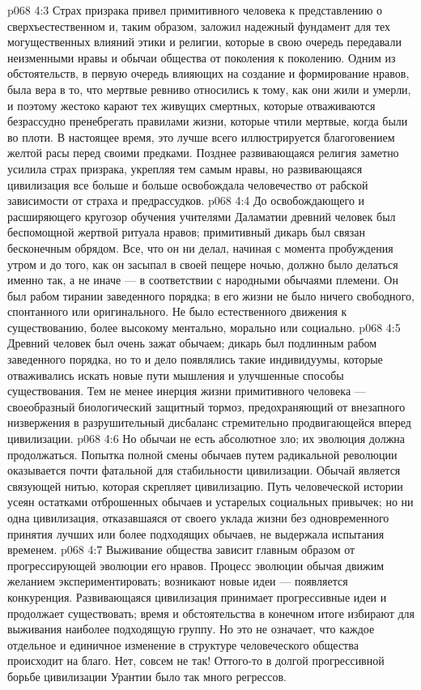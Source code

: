 \vs p068 4:3 \pc Страх призрака привел примитивного человека к представлению о сверхъестественном и, таким образом, заложил надежный фундамент для тех могущественных влияний этики и религии, которые в свою очередь передавали неизменными нравы и обычаи общества от поколения к поколению. Одним из обстоятельств, в первую очередь влияющих на создание и формирование нравов, была вера в то, что мертвые ревниво относились к тому, как они жили и умерли, и поэтому жестоко карают тех живущих смертных, которые отваживаются безрассудно пренебрегать правилами жизни, которые чтили мертвые, когда были во плоти. В настоящее время, это лучше всего иллюстрируется благоговением желтой расы перед своими предками. Позднее развивающаяся религия заметно усилила страх призрака, укрепляя тем самым нравы, но развивающаяся цивилизация все больше и больше освобождала человечество от рабской зависимости от страха и предрассудков.
\vs p068 4:4 До освобождающего и расширяющего кругозор обучения учителями Даламатии древний человек был беспомощной жертвой ритуала нравов; примитивный дикарь был связан бесконечным обрядом. Все, что он ни делал, начиная с момента пробуждения утром и до того, как он засыпал в своей пещере ночью, должно было делаться именно так, а не иначе --- в соответствии с народными обычаями племени. Он был рабом тирании заведенного порядка; в его жизни не было ничего свободного, спонтанного или оригинального. Не было естественного движения к существованию, более высокому ментально, морально или социально.
\vs p068 4:5 Древний человек был очень зажат обычаем; дикарь был подлинным рабом заведенного порядка, но то и дело появлялись такие индивидуумы, которые отваживались искать новые пути мышления и улучшенные способы существования. Тем не менее инерция жизни примитивного человека --- своеобразный биологический защитный тормоз, предохраняющий от внезапного низвержения в разрушительный дисбаланс стремительно продвигающейся вперед цивилизации.
\vs p068 4:6 Но обычаи не есть абсолютное зло; их эволюция должна продолжаться. Попытка полной смены обычаев путем радикальной революции оказывается почти фатальной для стабильности цивилизации. Обычай является связующей нитью, которая скрепляет цивилизацию. Путь человеческой истории усеян остатками отброшенных обычаев и устарелых социальных привычек; но ни одна цивилизация, отказавшаяся от своего уклада жизни без одновременного принятия лучших или более подходящих обычаев, не выдержала испытания временем.
\vs p068 4:7 Выживание общества зависит главным образом от прогрессирующей эволюции его нравов. Процесс эволюции обычая движим желанием экспериментировать; возникают новые идеи --- появляется конкуренция. Развивающаяся цивилизация принимает прогрессивные идеи и продолжает существовать; время и обстоятельства в конечном итоге избирают для выживания наиболее подходящую группу. Но это не означает, что каждое отдельное и единичное изменение в структуре человеческого общества происходит на благо. Нет, совсем не так! Оттого\hyp{}то в долгой прогрессивной борьбе цивилизации Урантии было так много регрессов.
